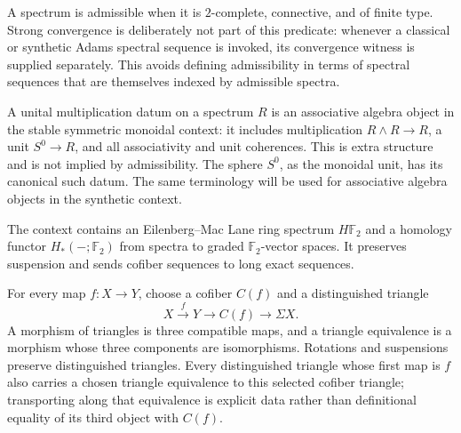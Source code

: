 \begin{definition}
  \label{def:admissible-spectrum}
  \notready
  A spectrum is admissible when it is $2$-complete, connective, and of finite
  type.  Strong convergence is deliberately not part of this predicate:
  whenever a classical or synthetic Adams spectral sequence is invoked, its
  convergence witness is supplied separately.  This avoids defining
  admissibility in terms of spectral sequences that are themselves indexed by
  admissible spectra.
\end{definition}

\begin{definition}
  \label{def:unital-multiplication-data}
  \notready
  A unital multiplication datum on a spectrum $R$ is an associative algebra
  object in the stable symmetric monoidal context: it includes multiplication
  $R\wedge R\to R$, a unit $S^0\to R$, and all associativity and unit
  coherences.  This is extra structure and is not implied by admissibility.
  The sphere $S^0$, as the monoidal unit, has its canonical such datum.  The
  same terminology will be used for associative algebra objects in the
  synthetic context.
\end{definition}

\begin{definition}
  \label{def:hf2-homology}
  \notready
  The context contains an Eilenberg--Mac Lane ring spectrum $H\mathbb F_2$ and
  a homology functor $H_*(-;\mathbb F_2)$ from spectra to graded
  $\mathbb F_2$-vector spaces.  It preserves suspension and sends cofiber
  sequences to long exact sequences.
\end{definition}

\begin{definition}
  \label{def:cofiber-triangle}
  \notready
  For every map $f:X\to Y$, choose a cofiber $C(f)$ and a distinguished
  triangle
  \[
    X\xrightarrow fY\longrightarrow C(f)\longrightarrow\Sigma X.
  \]
  A morphism of triangles is three compatible maps, and a triangle equivalence
  is a morphism whose three components are isomorphisms.  Rotations and
  suspensions preserve distinguished triangles.  Every distinguished triangle
  whose first map is $f$ also carries a chosen triangle equivalence to this
  selected cofiber triangle; transporting along that equivalence is explicit
  data rather than definitional equality of its third object with $C(f)$.
\end{definition}

